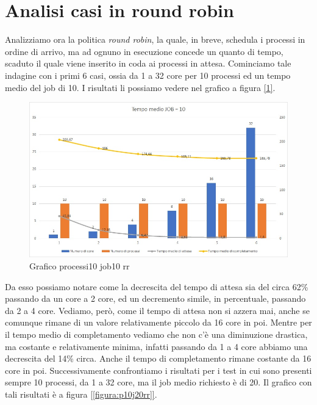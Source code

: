 \documentclass[Lau, oneside]{sapthesis}%
\begin{document}
\section{Analisi casi in round robin}
\label{sec:analisiRR}
Analizziamo ora la politica \textit{round robin}, la quale, in breve, schedula i processi in ordine di arrivo, ma ad ognuno in esecuzione concede un quanto di tempo, scaduto il quale viene inserito in coda ai processi in attesa.
Cominciamo tale indagine con i primi 6 casi, ossia da 1 a 32 core per 10 processi ed un tempo medio del job di 10.
I risultati li possiamo vedere nel grafico a figura \hyperref[figura:p10j10rr]{[\ref*{figura:p10j10rr}]}.
\begin{figure}[ht!]
  \centering
  \includegraphics[width=1\textwidth]{Grafico processi10 job10 rr.jpg}
  \caption{Grafico processi10 job10 rr}
  \label{figura:p10j10rr}
\end{figure}
Da esso possiamo notare come la decrescita del tempo di attesa sia del circa 62\% passando da un core a 2 core, ed un decremento simile, in percentuale, passando da 2 a 4 core.
Vediamo, però, come il tempo di attesa non si azzera mai, anche se comunque rimane di un valore relativamente piccolo da 16 core in poi.
Mentre per il tempo medio di completamento vediamo che non c'è una diminuzione drastica, ma costante e relativamente minima, infatti passando da 1 a 4 core abbiamo una decrescita del 14\% circa.
Anche il tempo di completamento rimane costante da 16 core in poi.
Successivamente confrontiamo i risultati per i test in cui sono presenti sempre 10 processi, da 1 a 32 core, ma il job medio richiesto è di 20.
Il grafico con tali risultati è a figura \hyperref[figura:p10j20rr]{[\ref*{figura:p10j20rr}]}.
\end{document}
